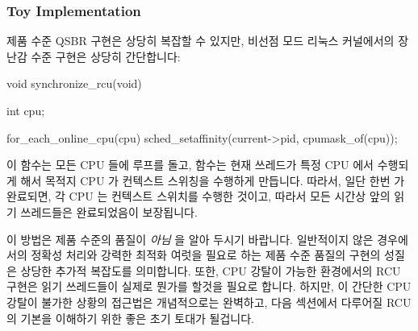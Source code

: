 \subsubsection{Toy Implementation}
\label{sec:defer:Toy Implementation}

제품 수준 QSBR 구현은 상당히 복잡할 수 있지만, 비선점 모드 리눅스 커널에서의
장난감 수준 구현은 상당히 간단합니다:

\begin{VerbatimN}[samepage=true]
void synchronize_rcu(void)
{
	int cpu;

	for_each_online_cpu(cpu)
		sched_setaffinity(current->pid, cpumask_of(cpu));
}
\end{VerbatimN}

이  함수는 모든 CPU 들에 루프를 돌고, 
함수는 현재 쓰레드가 특정 CPU 에서 수행되게 해서 목적지 CPU 가 컨텍스트
스위칭을 수행하게 만듭니다.
따라서, 일단 한번  가 완료되면, 각 CPU 는 컨텍스트
스위치를 수행한 것이고, 따라서 모든 시간상 앞의 읽기 쓰레드들은 완료되었음이
보장됩니다.

이 방법은 제품 수준의 품질이 \emph{아님} 을 알아 두시기 바랍니다.
일반적이지 않은 경우에서의 정확성 처리와 강력한 최적화 여럿을 필요로 하는 제품
수준 품질의 구현의 성질은 상당한 추가적 복잡도를 의미합니다.
또한, CPU 강탈이 가능한 환경에서의 RCU 구현은 읽기 쓰레드들이 실제로 뭔가를
할것을 필요로 합니다.
하지만, 이 간단한 CPU 강탈이 불가한 상황의 접근법은 개념적으로는 완벽하고, 다음
섹션에서 다루어질 RCU 의 기본을 이해하기 위한 좋은 초기 토대가 될겁니다.

